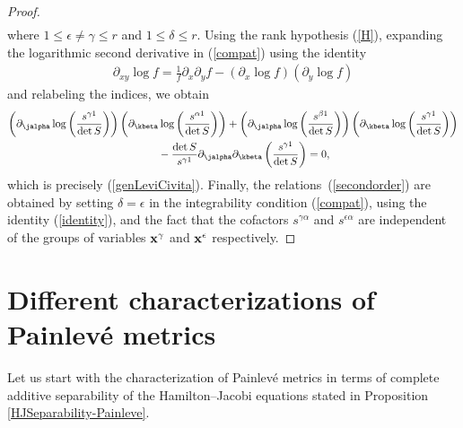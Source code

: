 \begin{proof}
\begin{gather}
\end{gather}
where $1\leq \epsilon \neq \gamma \leq r$ and $1\leq \delta \leq r$. Using the rank hypothesis (\ref{H}), expanding the logarithmic second derivative in (\ref{compat}) using the identity
\begin{gather}\label{identity}
\partial_{xy}\log f = \frac{1}{f}\partial_{x}\partial_{y}f-(\partial_{x}\log f)(\partial_{y}\log f)
\end{gather}
and
 relabeling the indices, we obtain
\begin{gather*}
\left(\partial_{\jalpha}\log\left(\frac{s^{\gamma 1}}{\det S}\right)\right) \left(\partial_{\kbeta}\log\left(\frac{s^{\alpha 1}}{\det S}\right)\right)+\left(\partial_{\jalpha}\log\left(\frac{s^{\beta 1}}{\det S}\right)\right)\left(\partial_{\kbeta}\log\left(\frac{s^{\gamma 1}}{\det S}\right)\right)\\
\qquad{}-\frac{\det S}{s^{\gamma 1}}\partial_{\jalpha}\partial_{\kbeta}\left(\frac{s^{\gamma 1}}{\det S}\right)=0,
\end{gather*}
which is precisely (\ref{genLeviCivita}). Finally, the relations~(\ref{secondorder}) are obtained by setting $\delta = \epsilon$ in the integrability condition (\ref{compat}), using the identity (\ref{identity}), and the fact that the cofactors $s^{\gamma \alpha}$ and $s^{\epsilon \alpha}$ are independent of the groups of variables ${\bf x}^{\gamma}$ and ${\bf x}^{\epsilon}$ respectively.
\end{proof}

\section{Different characterizations of Painlev\'e metrics}\label{PainHJSection}

Let us start with the characterization of Painlev\'e metrics in terms of complete additive separability of the Hamilton--Jacobi equations stated in Proposition \ref{HJSeparability-Painleve}.

